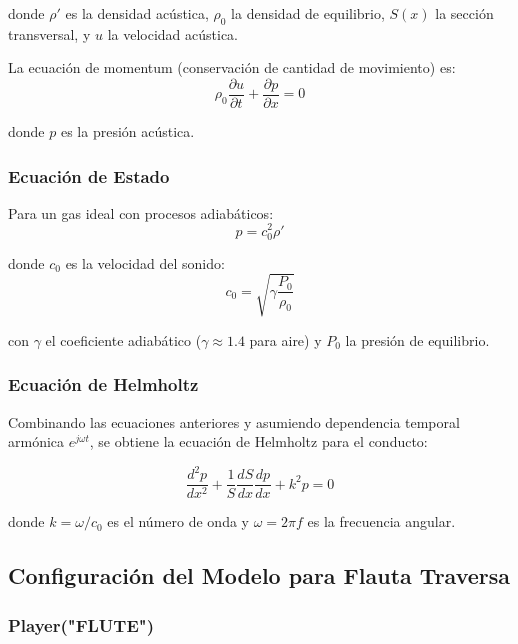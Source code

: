 \documentclass[12pt,a4paper,twocolumn]{article}
\begin{document}
donde $\rho'$ es la densidad acústica, $\rho_0$ la densidad de equilibrio, $S(x)$ la sección transversal, y $u$ la velocidad acústica.

La ecuación de momentum (conservación de cantidad de movimiento) es:
\begin{equation}
\rho_0 \frac{\partial u}{\partial t} + \frac{\partial p}{\partial x} = 0
\label{eq:momentum}
\end{equation}

donde $p$ es la presión acústica.

\subsubsection{Ecuación de Estado}

Para un gas ideal con procesos adiabáticos:
\begin{equation}
p = c_0^2 \rho'
\label{eq:estado}
\end{equation}

donde $c_0$ es la velocidad del sonido:
\begin{equation}
c_0 = \sqrt{\gamma \frac{P_0}{\rho_0}}
\label{eq:velocidad_sonido}
\end{equation}

con $\gamma$ el coeficiente adiabático ($\gamma \approx 1.4$ para aire) y $P_0$ la presión de equilibrio.

\subsubsection{Ecuación de Helmholtz}

Combinando las ecuaciones anteriores y asumiendo dependencia temporal armónica $e^{j\omega t}$, se obtiene la ecuación de Helmholtz para el conducto:

\begin{equation}
\frac{d^2 p}{dx^2} + \frac{1}{S}\frac{dS}{dx}\frac{dp}{dx} + k^2 p = 0
\label{eq:helmholtz}
\end{equation}

donde $k = \omega/c_0$ es el número de onda y $\omega = 2\pi f$ es la frecuencia angular.

\subsection{Configuración del Modelo para Flauta Traversa}

\subsubsection{Player("FLUTE")}
\end{document}
